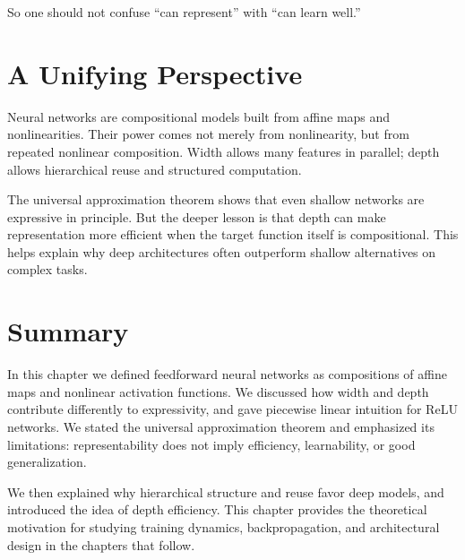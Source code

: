 So one should not confuse ``can represent'' with ``can learn well.''

\section{A Unifying Perspective}

Neural networks are compositional models built from affine maps and nonlinearities. Their power comes not merely from nonlinearity, but from repeated nonlinear composition. Width allows many features in parallel; depth allows hierarchical reuse and structured computation.

The universal approximation theorem shows that even shallow networks are expressive in principle. But the deeper lesson is that depth can make representation more efficient when the target function itself is compositional. This helps explain why deep architectures often outperform shallow alternatives on complex tasks.

\section{Summary}

In this chapter we defined feedforward neural networks as compositions of affine maps and nonlinear activation functions. We discussed how width and depth contribute differently to expressivity, and gave piecewise linear intuition for ReLU networks. We stated the universal approximation theorem and emphasized its limitations: representability does not imply efficiency, learnability, or good generalization.

We then explained why hierarchical structure and reuse favor deep models, and introduced the idea of depth efficiency. This chapter provides the theoretical motivation for studying training dynamics, backpropagation, and architectural design in the chapters that follow.